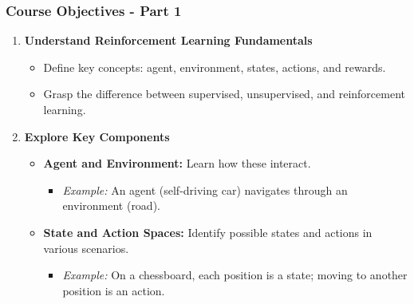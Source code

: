 \documentclass[aspectratio=169]{beamer}
\begin{document}
\begin{frame}[fragile]
    \frametitle{Course Objectives - Part 1}
    \begin{enumerate}
        \item \textbf{Understand Reinforcement Learning Fundamentals}
        \begin{itemize}
            \item Define key concepts: agent, environment, states, actions, and rewards.
            \item Grasp the difference between supervised, unsupervised, and reinforcement learning.
        \end{itemize}

        \item \textbf{Explore Key Components}
        \begin{itemize}
            \item \textbf{Agent and Environment:} Learn how these interact.
            \begin{itemize}
                \item \textit{Example:} An agent (self-driving car) navigates through an environment (road).
            \end{itemize}
            \item \textbf{State and Action Spaces:} Identify possible states and actions in various scenarios.
            \begin{itemize}
                \item \textit{Example:} On a chessboard, each position is a state; moving to another position is an action.
            \end{itemize}
        \end{itemize}
    \end{enumerate}
\end{frame}
\end{document}
